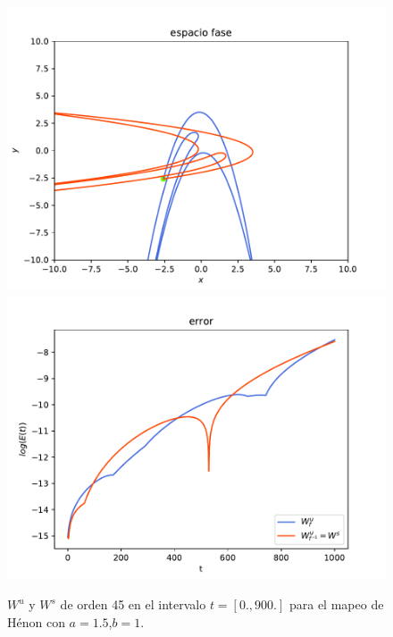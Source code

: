 \documentclass[11pt]{beamer}
\theoremstyle{definition}
\begin{document}
\begin{frame}
\begin{figure}[H]
	\centering
	\includegraphics[scale=0.35]{h15}
	\includegraphics[scale=0.35]{errorH15}
	\caption{$W^{u}$ y $W^{s}$ de orden 45 en el intervalo $t=[0.,900.]$ para el mapeo de Hénon con $a=1.5$,$b=1$.}
	\label{Henon1}
\end{figure}

\end{frame}
\end{document}
